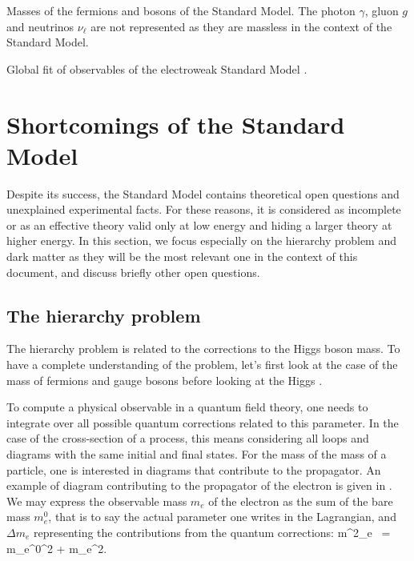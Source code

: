                  {Masses of the fermions and bosons of the Standard Model. The photon
                 $\gamma$, gluon $g$ and neutrinos $\nu_\ell$ are not represented as they
                 are massless in the context of the Standard Model.}

                 {Global fit of observables of the electroweak Standard Model \cite{GFitter}.}

    \section{Shortcomings of the Standard Model \label{sec:standardModelShortcomings}}

    Despite its success, the Standard Model contains theoretical open questions and unexplained
    experimental facts. For these reasons, it is considered as incomplete or as an effective
    theory valid only at low energy and hiding a larger theory at higher energy.
    In this section, we focus especially on the hierarchy problem and dark matter as they
    will be the most relevant one in the context of this document, and discuss briefly
    other open questions.

        \subsection{The hierarchy problem}

    The hierarchy problem is related to the corrections to the Higgs boson mass.
    To have a complete understanding of the problem, let's first look at the case of the
    mass of fermions and gauge bosons before looking at the Higgs \cite{SupersymmetryDemystified}.

    To compute a physical observable in a quantum field theory, one needs to
    integrate over all possible quantum corrections related to this parameter. In the case
    of the cross-section of a process, this means considering all loops and diagrams
    with the same initial and final states. For the mass of the mass of a particle, one is
    interested in diagrams that contribute to the propagator. An example of diagram contributing
    to the propagator of the electron is given in . We may
    express the observable mass $m_e$ of the electron as the sum of the bare mass $m^0_{e}$,
    that is to say the actual parameter one writes in the Lagrangian, and $\Delta m_e$ representing
    the contributions from the quantum corrections:
    {
        m^2_e \, = \, {m_e^0}^2 + \Delta m_e^2.
    }

